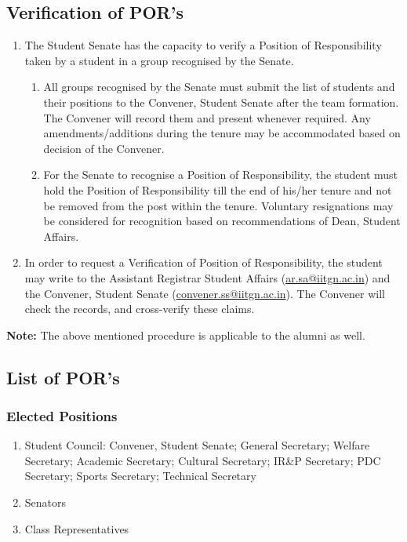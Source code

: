 \documentclass[12pt]{article}
\begin{document}
\subsection{Verification of POR's}
\begin{enumerate}
    \item The Student Senate has the capacity to verify a Position of Responsibility taken by a student in a group recognised by the Senate.
\begin{enumerate}
    \item All groups recognised by the Senate must submit the list of students and their positions to the Convener, Student Senate after the team formation. The Convener will record them and present whenever required. Any amendments/additions during the tenure may be accommodated based on decision of the Convener.
    \item For the Senate to recognise a Position of Responsibility, the student must hold the Position of Responsibility till the end of his/her tenure and not be removed from the post within the tenure. Voluntary resignations may be considered for recognition based on recommendations of Dean, Student Affairs.

\end{enumerate}
\item In order to request a Verification of Position of Responsibility, the student may write to the Assistant Registrar Student Affairs (\href{mailto:ar.sa@iitgn.ac.in}{ar.sa@iitgn.ac.in}) and the Convener, Student Senate (\href{mailto:convener.ss@iitgn.ac.in}{convener.ss@iitgn.ac.in}). The Convener will check the records, and cross-verify these claims.
\end{enumerate}

\textbf{Note:} The above mentioned procedure is applicable to the alumni as well.


\subsection{List of POR's}

\subsubsection{Elected Positions}
\begin{enumerate}
    \item Student Council: Convener, Student Senate; General Secretary; Welfare Secretary; Academic Secretary; Cultural Secretary; IR\&P Secretary; PDC Secretary; Sports Secretary; Technical Secretary
    \item Senators
    \item Class Representatives
\end{enumerate}
\end{document}
